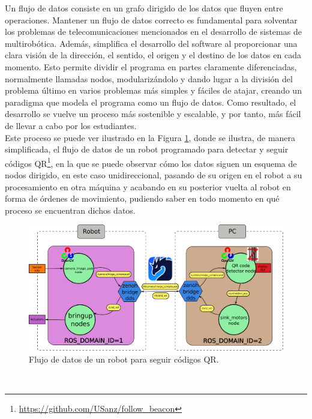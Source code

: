 Un flujo de datos consiste en un grafo dirigido de los datos que fluyen entre
operaciones.
Mantener un flujo de datos correcto es fundamental para solventar los problemas
de telecomunicaciones mencionados en el desarrollo de sistemas de multirobótica.
Además, simplifica el desarrollo del software al proporcionar una clara visión
de la dirección, el sentido, el origen y el destino de los datos en cada
momento.
Esto permite dividir el programa en partes claramente diferenciadas, normalmente
llamadas nodos, modularizándolo y dando lugar a la división del problema último
en varios problemas más simples y fáciles de atajar, creando un paradigma que
modela el programa como un flujo de datos.
Como resultado, el desarrollo se vuelve un proceso más sostenible y escalable, y
por tanto, más fácil de llevar a cabo por los estudiantes.
\\

Este proceso se puede ver ilustrado en la Figura \ref{fig:data_flow_qr_example},
donde se ilustra, de manera simplificada, el flujo de datos de un robot
programado para detectar y seguir códigos QR\footnote{
\href{https://github.com/USanz/follow_beacon}{https://github.com/USanz/follow\_beacon}},
en la que se puede observar cómo los datos siguen un esquema de nodos dirigido,
en este caso unidireccional, pasando de su origen en el robot a su procesamiento
en otra máquina y acabando en su posterior vuelta al robot en forma de órdenes
de movimiento, pudiendo saber en todo momento en qué proceso se encuentran
dichos datos.

\begin{figure} [h!]
  \begin{center}
    \includegraphics[width=15cm]{figs/QR_code_data_flow}
  \end{center}
  \caption{Flujo de datos de un robot para seguir códigos QR.}
  \label{fig:data_flow_qr_example}
\end{figure}\

